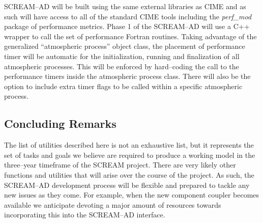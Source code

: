 SCREAM--AD will be built using the same external libraries as CIME and as such will have access to all of the standard CIME tools including the \emph{perf\_mod} package of performance metrics.  Phase 1 of the SCREAM--AD will use a C++ wrapper to call the set of performance Fortran routines.  Taking advantage of the generalized ``atmospheric process'' object class, the placement of performance timer will be automatic for the initialization, running and finalization of all atmospheric processes.  This will be enforced by hard--coding the call to the performance timers inside the atmospheric process class.  There will also be the option to include extra timer flags to be called within a specific atmospheric process.

\subsection{Concluding Remarks}
\label{sec:concluding}

The list of utilities described here is not an exhaustive list, but it represents the set of tasks and goals we believe are required to produce a working model in the three--year timeframe of the SCREAM project.  There are very likely other functions and utilities that will arise over the course of the project.  As such, the SCREAM--AD development process will be flexible and prepared to tackle any new issues as they come.  For example, when the new component coupler becomes available we anticipate devoting a major amount of resources towards incorporating this into the SCREAM--AD interface.




